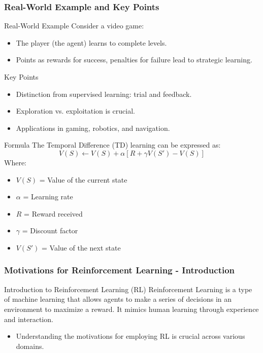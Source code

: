 \documentclass[aspectratio=169]{beamer}
\begin{document}
\begin{frame}[fragile]
    \frametitle{Real-World Example and Key Points}

    \begin{block}{Real-World Example}
        Consider a video game:
        \begin{itemize}
            \item The player (the agent) learns to complete levels.
            \item Points as rewards for success, penalties for failure lead to strategic learning.
        \end{itemize}
    \end{block}

    \begin{block}{Key Points}
        \begin{itemize}
            \item Distinction from supervised learning: trial and feedback.
            \item Exploration vs. exploitation is crucial.
            \item Applications in gaming, robotics, and navigation.
        \end{itemize}
    \end{block}
    
    \begin{block}{Formula}
        The Temporal Difference (TD) learning can be expressed as:
        \begin{equation}
            V(S) \leftarrow V(S) + \alpha [R + \gamma V(S') - V(S)]
        \end{equation}
        Where:
        \begin{itemize}
            \item \(V(S)\) = Value of the current state
            \item \(\alpha\) = Learning rate
            \item \(R\) = Reward received
            \item \(\gamma\) = Discount factor
            \item \(V(S')\) = Value of the next state
        \end{itemize}
    \end{block}
\end{frame}

\begin{frame}[fragile]
    \frametitle{Motivations for Reinforcement Learning - Introduction}
    \begin{block}{Introduction to Reinforcement Learning (RL)}
        Reinforcement Learning is a type of machine learning that allows agents to make a series of decisions in an environment to maximize a reward. It mimics human learning through experience and interaction.
    \end{block}
    \begin{itemize}
        \item Understanding the motivations for employing RL is crucial across various domains.
    \end{itemize}
\end{frame}
\end{document}
